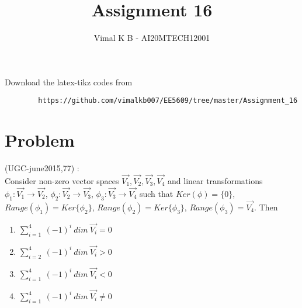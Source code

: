 \documentclass[journal,12pt]{IEEEtran}
\begin{document}
	\renewcommand{\thefigure}{\theproblem}
	\def\putbox#1#2#3{\makebox[0in][l]{\makebox[#1][l]{}\raisebox{\baselineskip}[0in][0in]{\raisebox{#2}[0in][0in]{#3}}}}
	\def\rightbox#1{\makebox[0in][r]{#1}}
	\def\centbox#1{\makebox[0in]{#1}}
	\def\topbox#1{\raisebox{-\baselineskip}[0in][0in]{#1}}
	\def\midbox#1{\raisebox{-0.5\baselineskip}[0in][0in]{#1}}
	\vspace{3cm}
	\title{Assignment 16}
	\author{Vimal K B - AI20MTECH12001}
	\maketitle
	\bigskip
	\renewcommand{\thefigure}{\theenumi}
	\renewcommand{\thetable}{\theenumi}
	Download the latex-tikz codes from 
	\begin{lstlisting}
		https://github.com/vimalkb007/EE5609/tree/master/Assignment_16
	\end{lstlisting}
	\section{\textbf{Problem}}
	(UGC-june2015,77) : \\
	Consider non-zero vector spaces $\vec{V_1}, \vec{V_2}, \vec{V_3}, \vec{V_4}$ and linear transformations $\phi_1 : \vec{V_1} \rightarrow \vec{V_2}$, $\phi_2 : \vec{V_2} \rightarrow \vec{V_3}$, $\phi_3 : \vec{V_3} \rightarrow \vec{V_4}$ such that $Ker(\phi) = \{0\}$, $Range(\phi_1) = Ker\{\phi_2\}$, $Range(\phi_2) = Ker\{\phi_3\}$, $Range(\phi_3) = \vec{V_4}$. Then \\
	
	\begin{enumerate}
		\item $\sum_{i=1}^{4} \ (-1)^{i} \ dim \ \vec{V_i} = 0$ \\
		\item $\sum_{i=2}^{4} \ (-1)^{i} \ dim \ \vec{V_i} > 0$ \\
		\item $\sum_{i=1}^{4} \ (-1)^{i} \ dim \ \vec{V_i} < 0$ \\
		\item $\sum_{i=1}^{4} \ (-1)^{i} \ dim \ \vec{V_i} \neq 0$
	\end{enumerate}
	
	
\end{document}
